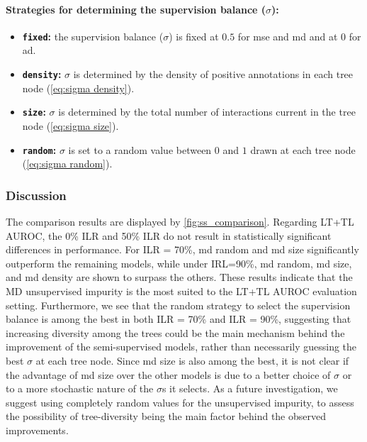 \paragraph*{Strategies for determining the supervision balance ($\sigma$):}
\begin{itemize}
    \item \textbf{\texttt{fixed}:} the supervision balance ($\sigma$) is fixed at $0.5$ for mse and md and at $0$ for ad.
    \item \textbf{\texttt{density}:} $\sigma$ is determined by the density of positive annotations in each tree node (\autoref{eq:sigma density}). 
    \item \textbf{\texttt{size}:} $\sigma$ is determined by the total number of interactions current in the tree node (\autoref{eq:sigma size}).
    \item \textbf{\texttt{random}:} $\sigma$ is set to a random value between $0$ and $1$ drawn at each tree node (\autoref{eq:sigma random}).
\end{itemize}

\subsubsection{Discussion}

The comparison results are displayed by \autoref{fig:ss_comparison}.
%
Regarding LT+TL AUROC, the 0\% ILR and 50\% ILR do not result in statistically significant differences in performance. For ILR = 70\%, md random and md size significantly outperform the remaining models, while under IRL=90\%, md random, md size, and md density are shown to surpass the others. These results indicate that the MD unsupervised impurity is the most suited to the LT+TL AUROC evaluation setting. Furthermore, we see that the random strategy to select the supervision balance %
is among the best in both ILR = 70\% and ILR = 90\%, suggesting that increasing diversity among the trees could be the main mechanism behind the improvement of the semi-supervised models, rather than necessarily guessing the best $\sigma$ at each tree node. Since md size is also among the best, it is not clear if the advantage of md size over the other models is due to a better choice of $\sigma$ or to a more stochastic nature of the $\sigma$s it selects.
%
%
As a future investigation, we suggest using completely random values for the unsupervised impurity, to assess the possibility of tree-diversity being the main factor behind the observed improvements.

